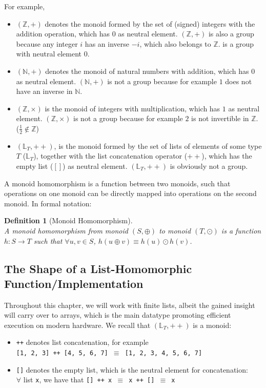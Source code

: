 \documentclass[acmsmall,review]{acmart}\settopmatter{printfolios=true,printccs=false,printacmref=false}
\newtheorem{mydef}{Definition}
\begin{document}
For example, 
\begin{itemize}
    \item $(\mathbb{Z},+)$ denotes the monoid formed by the set of (signed) 
            integers with the addition operation, which has $0$ as neutral
            element. $(\mathbb{Z},+)$ is also a group because any integer
            $i$ has an inverse $-i$, which also belongs to $\mathbb{Z}$. 
            is a group with neutral element $0$.
    \item $(\mathbb{N},+)$ denotes the monoid of natural numbers with
            addition, which has $0$ as neutral element. $(\mathbb{N},+)$  
            is not a group because for example $1$ does not have an 
            inverse in $\mathbb{N}$.
    \item $(\mathbb{Z},\times)$ is the monoid of integers with multiplication,
            which has $1$ as neutral element. $(\mathbb{Z},\times)$ is not
            a group because for example $2$ is not invertible in $\mathbb{Z}$.
            ($\frac{1}{2} \not\in \mathbb{Z}$)
    \item $(\mathbb{L}_T,++)$, is the monoid formed by the set of lists of 
            elements of some type $T$ ($\mathbb{L}_T$), together with the
            list concatenation operator ($++$), which has the empty list
            ($[]$) as neutral element.   $(\mathbb{L}_T,++)$ is obviously
            not a group.
\end{itemize}

A monoid homomorphism is a function between two monoids, such that 
operations on one monoid can be directly mapped into operations on
the second monoid. In formal notation:  

\begin{mydef}[Monoid Homomorphism]\label{HomDef}
$\mbox{ }$\\
\emph{A monoid homomorphism} from monoid $(S,\oplus)$ to monoid $(T,\odot)$
is a function $h : S \rightarrow T$ such that $\forall u, v\in S$,
\emph{$h(u\oplus v) \equiv h(u)\odot h(v)$}.
\end{mydef}


\subsection{The Shape of a List-Homomorphic Function/Implementation}

Throughout this chapter, we will work with finite lists,
albeit the gained insight will carry over to arrays, which
is the main datatype promoting efficient execution on 
modern hardware. We recall that $(\mathbb{L}_T,++)$ is
a monoid:
\begin{itemize}
    \item {\tt ++} denotes list concatenation, for example\\
    {\tt [1, 2, 3] ++ [4, 5, 6, 7] $\equiv$ [1, 2, 3, 4, 5, 6, 7]}
    \item {\tt []} denotes the empty list, which is the neutral 
          element for concatenation:\\ 
            $\forall$ list {\tt x}, we have that 
            {\tt [] ++ x $\equiv$ x ++ [] $\equiv$ x}
\end{itemize}
\end{document}
